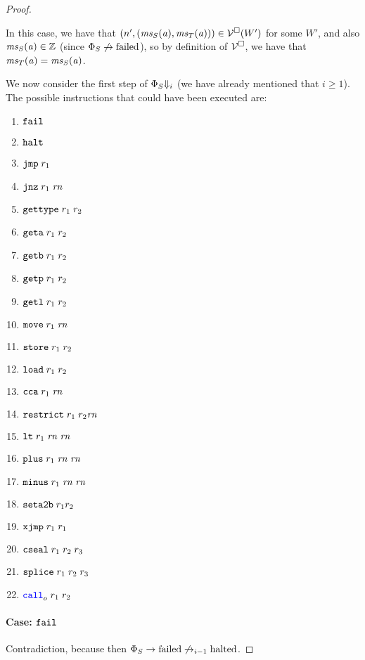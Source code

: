 \documentclass[a4paper]{article}
\begin{document}
\begin{proof}
\begin{itemize}
  In this case, we have that $\npair[n']{(\ms_S(\aaddr),\ms_T(\aaddr))} \in \lrv(W')$ for some $W'$, and also $\ms_S(\aaddr) \in \ints$ (since $\Phi_S \not\step\failed$), so by definition of $\lrv$, we have that $\ms_T(\aaddr) = \ms_S(\aaddr)$.
\end{itemize}

We now consider the first step of $\Phi_S \term[i]$ (we have already mentioned that $i \geq 1$).
The possible instructions that could have been executed are:
\begin{enumerate}
\item $\tfail$
\item $\thalt$
\item $\tjmp{\trg{r_1}}$
\item $\tjnz{\trg{r_1}}{\trg{\rn}}$
\item $\tisptr{\trg{r_1}}{\trg{r_2}}$
\item $\tgeta{\trg{r_1}}{\trg{r_2}}$
\item $\tgetb{\trg{r_1}}{\trg{r_2}}$
\item $\tgetp{\trg{r_1}}{\trg{r_2}}$
\item $\tgetlin{\trg{r_1}}{\trg{r_2}}$
\item $\tmove{\trg{r_1}}{\trg{\rn}}$
\item $\tstore{\trg{r_1}}{\trg{r_2}}$
\item $\tload{\trg{r_1}}{\trg{r_2}}$
\item $\tcca{\trg{r_1}}{\trg{\rn}}$
\item $\trestrict{\trg{r_1}}{\trg{r_2}}{\trg{\rn}}$
\item $\tlt{\trg{r_1}}{\trg{\rn}}{\trg{\rn}}$
\item $\tplus{\trg{r_1}}{\trg{\rn}}{\trg{\rn}}$
\item $\tminus{\trg{r_1}}{\trg{\rn}}{\trg{\rn}}$
\item $\tsetatob{\trg{r_1}}{\trg{r_2}}$
\item $\txjmp{\trg{r_1}}{\trg{r_1}}$
\item $\tcseal{\trg{r_1}}{\trg{r_2}}{\trg{r_3}}$
\item $\tsplice{\trg{r_1}}{\trg{r_2}}{\trg{r_3}}$
\item $\scall[o]{}{r_1}{r_2}$
\end{enumerate}

\paragraph{Case: $\protect\tfail$}
Contradiction, because then $\Phi_S \step \failed \not\nstep[i-1] \halted$.


\end{proof}
\end{document}
